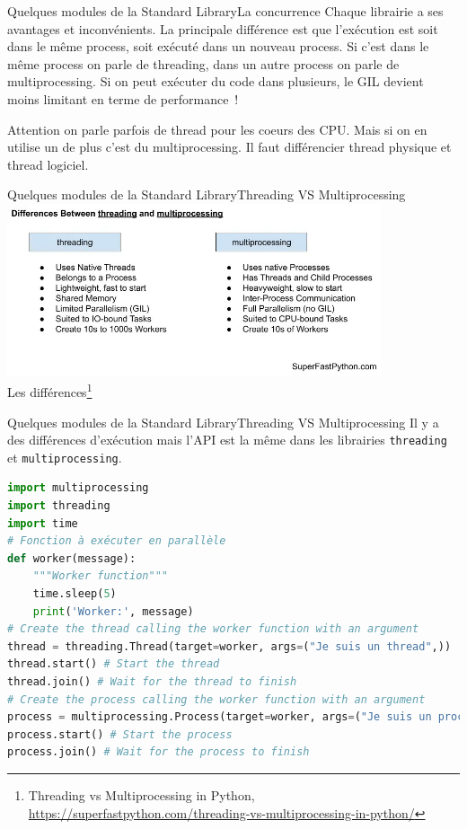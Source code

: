 \documentclass{beamer}
\begin{document}
    \begin{frame}{Quelques modules de la Standard Library}{La concurrence}
        Chaque librairie a ses avantages et inconvénients.
        La principale différence est que l'exécution est soit dans le même process, soit exécuté dans un nouveau process.
        \bigbreak
        Si c'est dans le même process on parle de threading, dans un autre process on parle de multiprocessing.
        \bigbreak
        Si on peut exécuter du code dans plusieurs, le GIL devient moins limitant en terme de performance~!
        \begin{dangercolorbox}
            Attention on parle parfois de thread pour les coeurs des CPU. Mais si on en utilise un de plus c'est du multiprocessing.
            Il faut différencier thread physique et thread logiciel.
        \end{dangercolorbox}
    \end{frame}

    \begin{frame}{Quelques modules de la Standard Library}{Threading VS Multiprocessing}
        \centering
        \includegraphics[width=11cm]{image/threading-vs-multiprocessing} \\ Les différences\footnote{Threading vs Multiprocessing in Python, \url{https://superfastpython.com/threading-vs-multiprocessing-in-python/}} \\
    \end{frame}

    \begin{frame}[fragile]{Quelques modules de la Standard Library}{Threading VS Multiprocessing}
        Il y a des différences d'exécution mais l'API est la même dans les librairies \lstinline{threading} et \lstinline{multiprocessing}.
        \begin{lstlisting}[language=Python]
import multiprocessing
import threading
import time
# Fonction à exécuter en parallèle
def worker(message):
    """Worker function"""
    time.sleep(5)
    print('Worker:', message)
# Create the thread calling the worker function with an argument
thread = threading.Thread(target=worker, args=("Je suis un thread",))
thread.start() # Start the thread
thread.join() # Wait for the thread to finish
# Create the process calling the worker function with an argument
process = multiprocessing.Process(target=worker, args=("Je suis un process",))
process.start() # Start the process
process.join() # Wait for the process to finish
        \end{lstlisting}
    \end{frame}
\end{document}
